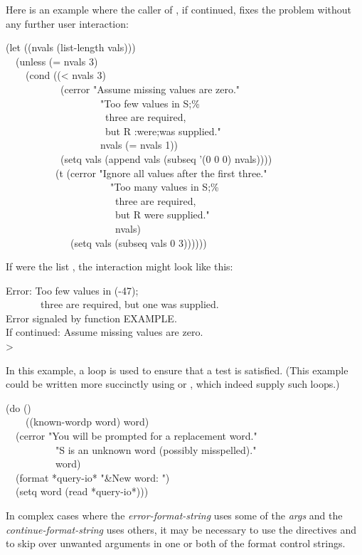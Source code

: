 \begin{defun}[Function]
Here is an example where the caller of , if continued,
fixes the problem without any further user interaction:
\begin{lisp}
(let ((nvals (list-length vals))) \\
~~(unless (= nvals 3) \\
~~~~(cond ((< nvals 3) \\
~~~~~~~~~~~(cerror "Assume missing values are zero." \\
~~~~~~~~~~~~~~~~~~~"Too few values in {\Xtilde}S;{\Xtilde}\%{\Xtilde} \\
~~~~~~~~~~~~~~~~~~~~three are required, {\Xtilde} \\
~~~~~~~~~~~~~~~~~~~~but {\Xtilde}R {\Xtilde}:{\Xlbracket}were{\Xtilde};was{\Xtilde}{\Xrbracket} supplied." \\
~~~~~~~~~~~~~~~~~~~nvals (= nvals 1)) \\
~~~~~~~~~~~(setq vals (append vals (subseq '(0 0 0) nvals)))) \\
~~~~~~~~~~(t (cerror "Ignore all values after the first three." \\
~~~~~~~~~~~~~~~~~~~~~"Too many values in {\Xtilde}S;{\Xtilde}\%{\Xtilde} \\
~~~~~~~~~~~~~~~~~~~~~~three are required, {\Xtilde} \\
~~~~~~~~~~~~~~~~~~~~~~but {\Xtilde}R were supplied." \\
~~~~~~~~~~~~~~~~~~~~~~nvals) \\
~~~~~~~~~~~~~(setq vals (subseq vals 0 3))))))
\end{lisp}
If  were the list , the interaction might look
like this:
\begin{lisp}
Error: Too few values in (-47); \\
~~~~~~~three are required, but one was supplied. \\
Error signaled by function EXAMPLE. \\
If continued: Assume missing values are zero. \\
>
\end{lisp}
In this example, a loop is used to ensure that a test is satisfied.
(This example could be written more succinctly using 
or , which indeed supply such loops.)
\begin{lisp}
(do () \\
~~~~((known-wordp word) word) \\
~~(cerror "You will be prompted for a replacement word." \\
~~~~~~~~~~"{\Xtilde}S is an unknown word (possibly misspelled)." \\
~~~~~~~~~~word) \\
~~(format *query-io* "{\Xtilde}\&New word: ") \\
~~(setq word (read *query-io*)))
\end{lisp}

In complex cases where the \emph{error-format-string}
uses some of the \emph{args} and the
\emph{continue-format-string} uses others, it may be necessary to use the
 directives \cd{{\Xtilde}*} and \cd{{\Xtilde}{\Xatsign}*}
to skip over unwanted arguments in one or both of the
format control strings.
\end{defun}

